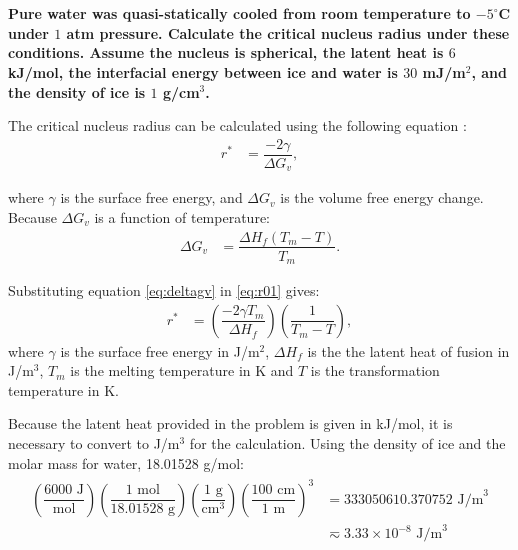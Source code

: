 \newpage
\section{}

\subsection{}
\textbf{Pure water was quasi-statically cooled from room temperature to $-5^{\circ}$C under $1$ atm pressure. Calculate the critical nucleus radius under these conditions. Assume the nucleus is spherical, the latent heat is $6$ kJ/mol, the interfacial energy between ice and water is $30$ mJ/m$^2$, and the density of ice is $1$ g/cm$^3$.}

The critical nucleus radius can be calculated using the following equation \citet{callister2010materials}: 
\begin{align}
  \label{eq:r01}
  r^*&=\dfrac{-2\gamma}{\Delta G_v},
\end{align}

where $\gamma$ is the surface free energy, and $\Delta G_v$ is the volume free energy change. Because $\Delta G_v$ is a function of temperature:
\begin{align}
  \label{eq:deltagv}
  \Delta G_v&= \dfrac{\Delta H_f\left(T_m-T\right)}{T_m}.
\end{align}

Substituting equation \ref{eq:deltagv} in \ref{eq:r01} gives: 
\begin{align}
  \label{eq:nucleus_radius}
  r^*&=\left(\dfrac{-2\gamma T_m}{\Delta H_f}\right)\left(\dfrac{1}{T_m - T}\right),
\end{align}
where $\gamma$ is the surface free energy in J/m$^2$, $\Delta H_f$ is the the latent heat of fusion in J/m$^3$, $T_m$ is the melting temperature in K and $T$ is the transformation temperature in K.

Because the latent heat provided in the problem is given in kJ/mol, it is necessary to convert to J/m$^3$ for the calculation. Using the density of ice and the molar mass for water, 18.01528 g/mol:
\begin{align}
  \begin{split}
    \left(\dfrac{6000\text{ J}}{\text{mol}}\right)\left(\dfrac{1\text{ mol}}{18.01528\text{ g}}\right)\left(\dfrac{1\text{ g}}{\text{cm}^3}\right)\left(\dfrac{100\text{ cm}}{1\text{ m}}\right)^3&=333050610.370752 \text{ J/m}^3 \\
  &\eqsim 3.33\times10^{-8} \text{ J/m}^3
  \end{split}
  \label{eq:deltaH_calculation}
\end{align}

